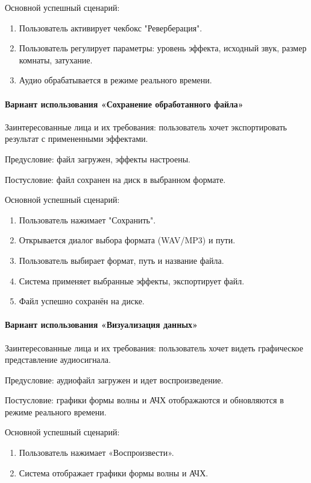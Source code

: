 Основной успешный сценарий:
\begin{enumerate}
	\item Пользователь активирует чекбокс "Реверберация".
	\item Пользователь регулирует параметры: уровень эффекта, исходный звук, размер комнаты, затухание.
	\item Аудио обрабатывается в режиме реального времени.
\end{enumerate}	

\paragraph{Вариант использования «Сохранение обработанного файла»}

Заинтересованные лица и их требования: пользователь хочет экспортировать результат с примененными эффектами.

Предусловие: файл загружен, эффекты настроены.

Постусловие: файл сохранен на диск в выбранном формате.

Основной успешный сценарий:
\begin{enumerate}
	\item Пользователь нажимает "Сохранить".
	\item Открывается диалог выбора формата (WAV/MP3) и пути.
	\item Пользователь выбирает формат, путь и название файла.
	\item Система применяет выбранные эффекты, экспортирует файл.
	\item Файл успешно сохранён на диске.
\end{enumerate}		

\paragraph{Вариант использования «Визуализация данных»}

Заинтересованные лица и их требования: пользователь хочет видеть графическое представление аудиосигнала.

Предусловие: аудиофайл загружен и идет воспроизведение.

Постусловие: графики формы волны и АЧХ отображаются и обновляются в режиме реального времени.

Основной успешный сценарий:
\begin{enumerate}
	\item Пользователь нажимает «Воспроизвести».
	\item Система отображает графики формы волны и АЧХ.
\end{enumerate}	

